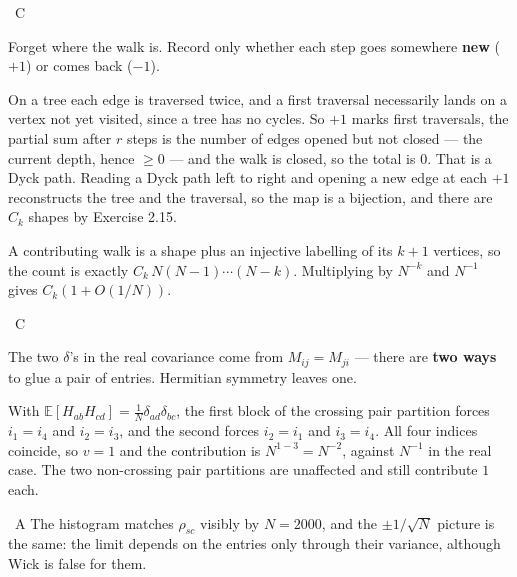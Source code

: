 \documentclass[10pt]{article}
\newcommand{\Q}[2]{\medskip\noindent{\color{acc}\textbf{#1}}\ {\scriptsize\color{grey}\textsc{#2}}\quad}
\newcommand{\E}{\mathbb{E}}
\begin{document}
\Q{2.16}{C}
\begin{idea}
Forget where the walk is. Record only whether each step goes somewhere \textbf{new} ($+1$) or comes back ($-1$).
\end{idea}
On a tree each edge is traversed twice, and a first traversal necessarily lands on a vertex not yet visited, since a tree has no cycles. So $+1$ marks first traversals, the partial sum after $r$ steps is the number of edges opened but not closed --- the current depth, hence $\ge0$ --- and the walk is closed, so the total is $0$. That is a Dyck path. Reading a Dyck path left to right and opening a new edge at each $+1$ reconstructs the tree and the traversal, so the map is a bijection, and there are $C_k$ shapes by Exercise 2.15.

A contributing walk is a shape plus an injective labelling of its $k+1$ vertices, so the count is exactly $C_k\,N(N-1)\cdots(N-k)$. Multiplying by $N^{-k}$ and $N^{-1}$ gives $C_k(1+O(1/N))$.

\Q{2.17}{C}
\begin{idea}
The two $\delta$'s in the real covariance come from $M_{ij}=M_{ji}$ --- there are \textbf{two ways} to glue a pair of entries. Hermitian symmetry leaves one.
\end{idea}
With $\E[H_{ab}H_{cd}]=\frac1N\delta_{ad}\delta_{bc}$, the first block of the crossing pair partition forces $i_1=i_4$ and $i_2=i_3$, and the second forces $i_2=i_1$ and $i_3=i_4$. All four indices coincide, so $v=1$ and the contribution is $N^{1-3}=N^{-2}$, against $N^{-1}$ in the real case. The two non-crossing pair partitions are unaffected and still contribute $1$ each.

\Q{2.18}{A} The histogram matches $\rho_{sc}$ visibly by $N=2000$, and the $\pm1/\sqrt N$ picture is the same: the limit depends on the entries only through their variance, although Wick is false for them.
\end{document}
